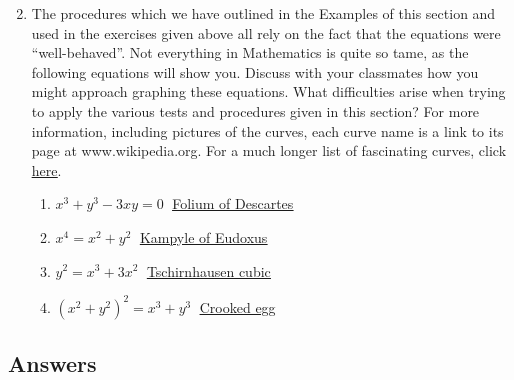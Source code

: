 \begin{enumerate}
\begin{multicols}{2}
\begin{enumerate}
\end{enumerate}

\end{multicols}

\item The procedures which we have outlined in the Examples of this section and used in the exercises given above all rely on the fact that the equations were ``well-behaved''.  Not everything in Mathematics is quite so tame, as the following equations will show you.  Discuss with your classmates how you might approach graphing these equations.  What difficulties arise when trying to apply the various tests and procedures given in this section?  For more information, including pictures of the curves, each curve name is a link to its page at www.wikipedia.org.  For a much longer list of fascinating curves, click \href{http://en.wikipedia.org/wiki/List_of_curves}{\underline{here}}.
\label{listofcurves}

\begin{multicols}{2}

\begin{enumerate}

\item $x^{3} + y^{3} - 3xy = 0\;$ \href{http://en.wikipedia.org/wiki/Folium_of_descartes}{\underline{Folium of Descartes}}
\item $x^{4} = x^{2} + y^{2}\;$ \href{http://en.wikipedia.org/wiki/Kampyle_of_Eudoxus}{\underline{Kampyle of Eudoxus}}
\item $y^{2} = x^{3} + 3x^{2}\;$ \href{http://en.wikipedia.org/wiki/Tschirnhausen_cubic}{\underline{Tschirnhausen cubic}}
\item $(x^{2} + y^{2})^{2} = x^{3} + y^{3}\;$ \href{http://en.wikipedia.org/wiki/Crooked_egg_curve}{\underline{Crooked egg}} 

\end{enumerate}

\end{multicols}

\end{enumerate}

\newpage

\subsection{Answers}

